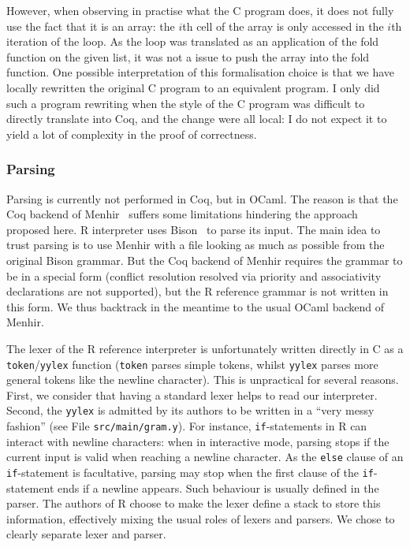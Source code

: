 \documentclass{article}
\newcommand\Coq{Coq}
\newcommand\OCaml{OCaml}
\newcommand\R{R}
\newcommand\Cn{C}
\begin{document}
However, when observing in practise what the \Cn{} program
does, it does not fully use the fact that it is an array:
the \(i\)th cell of the array is only accessed in the \(i\)th
iteration of the loop.
As the loop was translated as an application of the fold function
on the given list,
it was not a issue to push the array into the fold function.
One possible interpretation of this formalisation choice
is that we have locally rewritten the original \Cn{} program
to an equivalent program.
I only did such a program rewriting when the style of the \Cn{}
program was difficult to directly translate into \Coq{},
and the change were all local:
I do not expect it to yield a lot of complexity in the proof of correctness.


\subsubsection{Parsing}
\label{sec:parsing}

Parsing is currently not performed in \Coq{}, but in \OCaml{}.
The reason is that the \Coq{} backend of Menhir~\parencite{jourdan2012validating}
suffers some limitations hindering the approach proposed here.
\R{} interpreter uses Bison~\parencite{Bison} to parse its input.
The main idea to trust parsing
is to use Menhir with a file looking as much as possible
from the original Bison grammar.
But the \Coq{} backend of Menhir requires the grammar to be in a special
form (conflict resolution resolved via priority and associativity declarations
are not supported),
but the \R{} reference grammar is not written in this form.
We thus backtrack in the meantime to the usual \OCaml{} backend of Menhir.

The lexer of the \R{} reference interpreter is unfortunately
written directly in \Cn{} as a \texttt{token}/\texttt{yylex} function
(\texttt{token} parses simple tokens,
whilst \texttt{yylex} parses more general tokens
like the newline character).
This is unpractical for several reasons.
First, we consider that having a standard lexer helps to read our interpreter.
Second, the \texttt{yylex} is admitted by its authors
to be written in a “very messy fashion”
(see File \texttt{src/main/gram.y}).
For instance, \texttt{if}-statements in \R{} can interact with
newline characters:
when in interactive mode, parsing stops if the current input is valid
when reaching a newline character.
As the \texttt{else} clause of an \texttt{if}-statement
is facultative,
parsing may stop when the first clause of the \texttt{if}-statement
ends if a newline appears.
Such behaviour is usually defined in the parser.
The authors of \R{} choose to make the lexer define a stack
to store this information,
effectively mixing the usual roles of lexers and parsers.
We chose to clearly separate lexer and parser.
\end{document}
